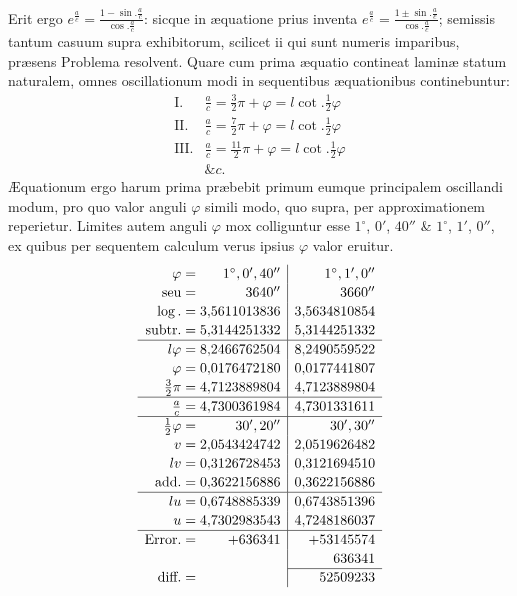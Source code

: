 Erit ergo $e^{\frac ac}=\frac{1-\sin.\frac ac}{\cos.\frac ac}$: sicque in æquatione prius inventa $e^{\frac ac}=\frac{1\pm\sin.\frac ac}{\cos.\frac ac}$; semissis tantum casuum supra exhibitorum, scilicet ii qui sunt numeris imparibus, præsens Problema resolvent. Quare cum prima æquatio contineat laminæ statum naturalem, omnes oscillationum modi in sequentibus æquationibus continebuntur:
\[\begin{array}{rl}
\mathrm{I}.&\frac ac=\frac32\pi+\varphi=l\cot.\frac12\varphi\\
\mathrm{II}.&\frac ac=\frac72\pi+\varphi=l\cot.\frac12\varphi\\
\mathrm{III}.&\frac ac=\frac{11}2\pi+\varphi=l\cot.\frac12\varphi\\
&\&c.
\end{array}\]
Æquationum ergo harum prima præbebit primum eumque principalem oscillandi modum, pro quo valor anguli $\varphi$ simili modo, quo supra, per approximationem reperietur. Limites autem anguli $\varphi$ mox colliguntur esse $1^\circ$, $0'$, $40''$ \& $1^\circ$, $1'$, $0''$, ex quibus per sequentem calculum verus ipsius $\varphi$ valor eruitur.
\[\renewcommand{\arraystretch}{1.12}\begin{array}{r@{\;=\;}r|r}
\varphi&1^\circ,0',40''&1^\circ,1',0''\\
\text{seu}&3640''&3660''\\
\log.&3{,}5611013836&3{,}5634810854\\
\text{subtr.}&5{,}3144251332&5{,}3144251332\\\hline
l\varphi&8{,}2466762504&8{,}2490559522\\
\varphi&0{,}0176472180&0{,}0177441807\\
\frac32\pi&4{,}7123889804&4{,}7123889804\\\hline
\frac ac&4{,}7300361984&4{,}7301331611\\\hline
\frac12\varphi&30',20''&30',30''\\
v&2{,}0543424742&2{,}0519626482\\
lv&0{,}3126728453&0{,}3121694510\\
\text{add.}&0{,}3622156886&0{,}3622156886\\\hline
lu&0{,}6748885339&0{,}6743851396\\
u&4{,}7302983543&4{,}7248186037\\\hline
\text{Error.}&+636341&+53145574\\
\multicolumn{1}{r}{}&&636341\\\cline{3-3}
\text{diff.}&&52509233
\end{array}\]

